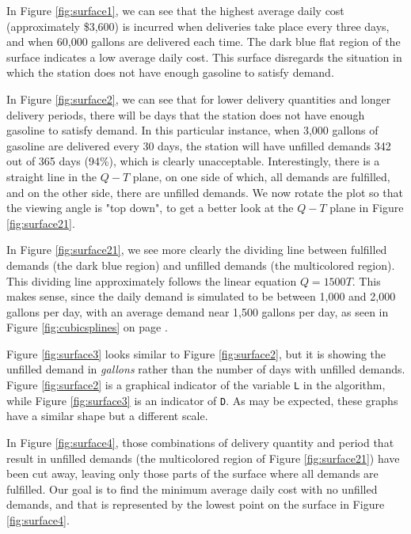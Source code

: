 \documentclass{article}
\begin{document}
    In Figure \ref{fig:surface1}, we can see that the highest average daily cost (approximately \$3,600) is incurred when deliveries take place every three days, and when 60,000 gallons are delivered each time. The dark blue flat region of the surface indicates a low average daily cost. This surface disregards the situation in which the station does not have enough gasoline to satisfy demand.

    In Figure \ref{fig:surface2}, we can see that for lower delivery quantities and longer delivery periods, there will be days that the station does not have enough gasoline to satisfy demand. In this particular instance, when 3,000 gallons of gasoline are delivered every 30 days, the station will have unfilled demands 342 out of 365 days (94\%), which is clearly unacceptable. Interestingly, there is a straight line in the $Q-T$ plane, on one side of which, all demands are fulfilled, and on the other side, there are unfilled demands. We now rotate the plot so that the viewing angle is "top down", to get a better look at the $Q-T$ plane in Figure \ref{fig:surface21}.

    In Figure \ref{fig:surface21}, we see more clearly the dividing line between fulfilled demands (the dark blue region) and unfilled demands (the multicolored region). This dividing line approximately follows the linear equation $Q = 1500T$. This makes sense, since the daily demand is simulated to be between 1,000 and 2,000 gallons per day, with an average demand near 1,500 gallons per day, as seen in Figure \ref{fig:cubicsplines} on page \pageref{fig:cubicsplines}.

    Figure \ref{fig:surface3} looks similar to Figure \ref{fig:surface2}, but it is showing the unfilled demand in \emph{gallons} rather than the number of days with unfilled demands. Figure \ref{fig:surface2} is a graphical indicator of the variable \texttt{L} in the algorithm, while Figure \ref{fig:surface3} is an indicator of \texttt{D}. As may be expected, these graphs have a similar shape but a different scale.

    In Figure \ref{fig:surface4}, those combinations of delivery quantity and period that result in unfilled demands (the multicolored region of Figure \ref{fig:surface21}) have been cut away, leaving only those parts of the surface where all demands are fulfilled. Our goal is to find the minimum average daily cost with no unfilled demands, and that is represented by the lowest point on the surface in Figure \ref{fig:surface4}.
\end{document}
